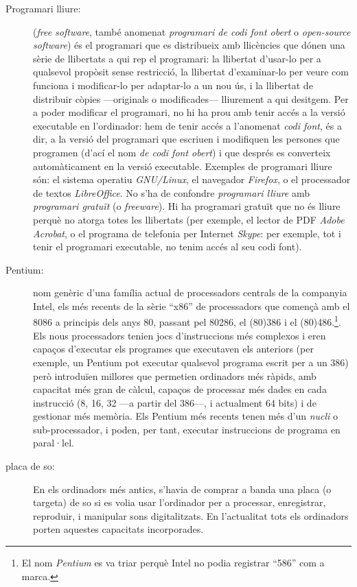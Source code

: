 \begin{description}
\item[Programari lliure:] (\emph{free software}, també anomenat
  \emph{programari de codi font obert} o \emph{open-source software})
  és el programari que es distribueix amb llicències que dónen una
  sèrie de llibertats a qui rep el programari: la llibertat d'usar-lo
  per a qualsevol propòsit sense restricció, la llibertat
  d'examinar-lo per veure com funciona i modificar-lo per adaptar-lo a
  un nou ús, i la llibertat de distribuir còpies ---originals o
  modificades--- lliurement a qui desitgem. Per a poder modificar el
  programari, no hi ha prou amb tenir accés a la versió executable en
  l'ordinador: hem de tenir accés a l'anomenat \emph{codi font}, és a
  dir, a la versió del programari que escriuen i modifiquen les
  persones que programen (d'ací el nom \emph{de codi font obert}) i
  que després es converteix automàticament en la versió
  executable. Exemples de programari lliure són: el sistema operatiu
  \emph{GNU/Linux}, el navegador \emph{Firefox}, o el processador de textos
  \emph{LibreOffice}. No s'ha de confondre \emph{programari lliure} amb
  \emph{programari gratuït} (o \emph{freeware}). Hi ha programari
  gratuït que no és lliure perquè no atorga totes les llibertats (per
  exemple, el lector de PDF \emph{Adobe Acrobat}, o el programa de
  telefonia per Internet \emph{Skype}: per exemple, tot i tenir el
  programari executable, no tenim accés al seu codi font).
  
\item[Pentium:] nom genèric d'una família actual de processadors
  centrals de la companyia Intel, els més recents de la sèrie ``x86''
  de processadors que començà amb el 8086 a principis dels anys 80,
  passant pel 80286, el (80)386 i el (80)486.\footnote{El nom
    \emph{Pentium} es va triar perquè Intel no podia registrar ``586''
    com a marca.}. Els nous processadors tenien jocs d'instruccions
  més complexos i eren capaços d'executar els programes que executaven
  els anteriors (per exemple, un Pentium pot executar qualsevol
  programa escrit per a un 386) però introduïen millores que permetien
  ordinadors més ràpids, amb capacitat més gran de càlcul, capaços de
  processar més dades en cada instrucció (8, 16, 32 ---a partir del
  386---, i actualment 64 bits) i de gestionar més memòria. Els
  Pentium més recents tenen més d'un \emph{nucli} o sub-processador, i
  poden, per tant, executar instruccions de programa en paral·lel.

\item[placa de so:] En els ordinadors més antics, s'havia de comprar a
  banda una placa (o targeta) de so si es volia usar l'ordinador per a
  processar, enregistrar, reproduir, i manipular sons
  digitalitzats. En l'actualitat tots els ordinadors porten aquestes
  capacitats incorporades.


\end{description}
